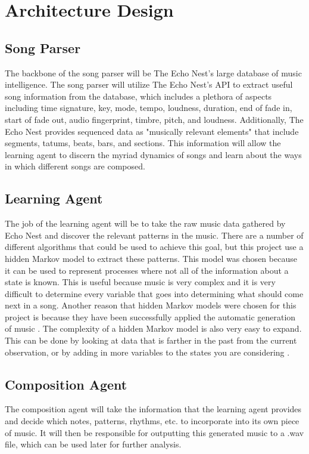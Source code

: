 \documentclass{article}
\begin{document}
\section{Architecture Design}
\subsection{Song Parser}
The backbone of the song parser will be The Echo Nest's large database of music intelligence. The song parser will utilize The Echo Nest's API to extract useful song information from the database, which includes a plethora of aspects including time signature, key, mode, tempo, loudness, duration, end of fade in, start of fade out, audio fingerprint, timbre, pitch, and loudness. Additionally, The Echo Nest provides sequenced data as "musically relevant elements" that include segments, tatums, beats, bars, and sections. This information will allow the learning agent to discern the myriad dynamics of songs and learn about the ways in which different songs are composed.

\subsection{Learning Agent}
The job of the learning agent will be to take the raw music data gathered by Echo Nest and discover the relevant patterns in the music. There are a number of different algorithms that could be used to achieve this goal, but this project use a hidden Markov model to extract these patterns. This model was chosen because it can be used to represent processes where not all of the information about a state is known. This is useful because music is very complex and it is very difficult to determine every variable that goes into determining what should come next in a song. Another reason that hidden Markov models were chosen for this project is because they have been successfully applied the automatic generation of music \cite{5492670}. The complexity of a hidden Markov model is also very easy to expand. This can be done by looking at data that is farther in the past from the current observation, or by adding in more variables to the states you are considering \cite{Wiki}.\\

\subsection{Composition Agent}
The composition agent will take the information that the learning agent provides and decide which notes, patterns, rhythms, etc. to incorporate into its own piece of music. It will then be responsible for outputting this generated music to a .wav file, which can be used later for further analysis.
\end{document}
